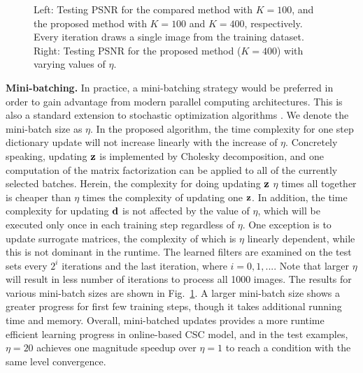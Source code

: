 \begin{figure}[h]
\caption{Left: Testing PSNR for the compared method with $K=100$, and the proposed method with $K=100$ and $K=400$, respectively. Every iteration draws a single image from the training dataset. Right: Testing PSNR for the proposed method ($K=400$) with varying values of $\eta$.}
\label{fig:overComDicAndMinibatch}
\end{figure}

{\bfseries Mini-batching.} In practice, a mini-batching strategy would be preferred in order to gain advantage from modern parallel computing architectures. This is also a standard extension to stochastic optimization algorithms \cite{Takac2013, PCDM, SCSG}. We denote the mini-batch size as $\eta$. In the proposed algorithm, the time complexity for one step dictionary update will not increase linearly with the increase of $\eta$. Concretely speaking, updating $\code$ is implemented by Cholesky decomposition, and one computation of the matrix factorization can be applied to all of the currently selected batches. Herein, the complexity for doing updating $\code$ $\eta$ times all together is cheaper than $\eta$ times the complexity of updating one $\code$. In addition, the time complexity for updating $\filter$ is not affected by the value of $\eta$, which will be executed only once in each training step regardless of $\eta$. One exception is to update surrogate matrices, the complexity of which is $\eta$ linearly dependent, while this is not dominant in the runtime. The learned filters are examined on the test sets every $2^i$ iterations and the last iteration, where $i=0,1,...$. Note that larger $\eta$ will result in less number of iterations to process all 1000 images. The results for various mini-batch sizes are shown in Fig.~\ref{fig:overComDicAndMinibatch}. A larger mini-batch size shows a greater progress for first few training steps, though it takes additional running time and memory. Overall, mini-batched updates provides a more runtime efficient learning progress in online-based CSC model, and in the test examples, $\eta=20$ achieves one magnitude speedup over $\eta=1$ to reach a condition with the same level convergence.

